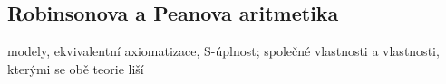

\subsection{Robinsonova a Peanova aritmetika}
modely, ekvivalentní axiomatizace, S-úplnost; společné vlastnosti a vlastnosti, kterými se obě teorie liší

